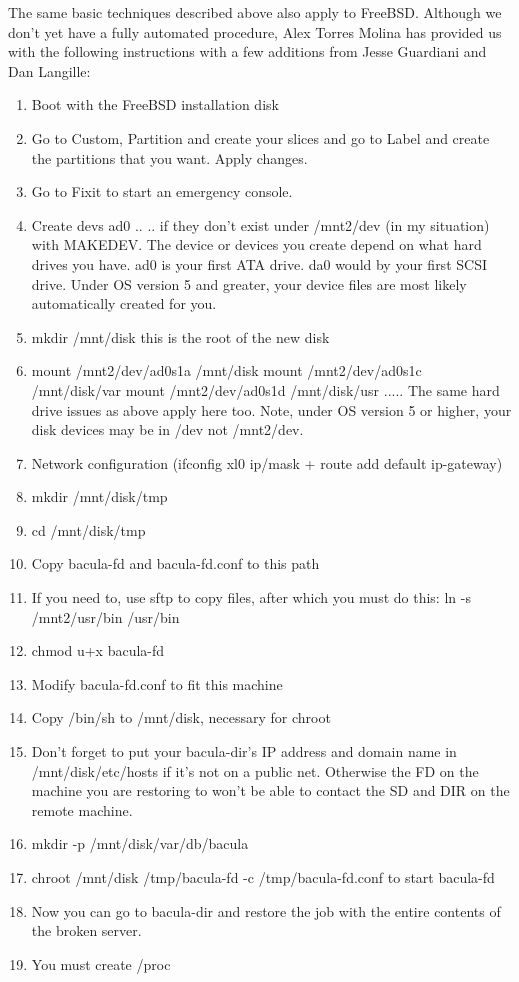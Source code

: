 The same basic techniques described above also apply to FreeBSD. Although we
don't yet have a fully automated procedure, Alex Torres Molina has provided us
with the following instructions with a few additions from Jesse Guardiani and
Dan Langille: 

\begin{enumerate}
\item Boot with the FreeBSD installation disk 
\item Go to Custom, Partition and create your slices and go to Label and 
   create the partitions that you want. Apply changes. 
\item Go to Fixit to start an emergency console. 
\item Create devs ad0 .. .. if they don't exist under /mnt2/dev (in my  situation)
   with MAKEDEV. The device or devices you  create depend on what hard drives you
   have. ad0 is your  first ATA drive. da0 would by your first SCSI drive.  Under
OS version 5 and greater, your device files are  most likely automatically
created for you. 
\item mkdir /mnt/disk
   this is the root of the new disk 
\item mount /mnt2/dev/ad0s1a /mnt/disk
   mount /mnt2/dev/ad0s1c /mnt/disk/var
   mount /mnt2/dev/ad0s1d /mnt/disk/usr
.....
The same hard drive issues as above apply here too.  Note, under OS version 5
or higher, your disk devices may  be in /dev not /mnt2/dev. 
\item Network configuration (ifconfig xl0 ip/mask + route add default 
   ip-gateway) 
\item mkdir /mnt/disk/tmp 
\item cd /mnt/disk/tmp 
\item Copy bacula-fd and bacula-fd.conf to this path 
\item If you need to, use sftp to copy files, after which you must do this:
   ln -s /mnt2/usr/bin /usr/bin 
\item chmod u+x bacula-fd 
\item Modify bacula-fd.conf to fit this machine 
\item Copy /bin/sh to /mnt/disk, necessary for chroot 
\item Don't forget to put your bacula-dir's IP address and domain  name in
   /mnt/disk/etc/hosts if it's not on a public net.  Otherwise the FD on the
   machine you are restoring to  won't be able to contact the SD and DIR on the
remote machine. 
\item mkdir -p /mnt/disk/var/db/bacula 
\item chroot /mnt/disk /tmp/bacula-fd -c /tmp/bacula-fd.conf
   to start bacula-fd 
\item Now you can go to bacula-dir and restore the job with the entire 
   contents of the broken server. 
\item You must create /proc 
\end{enumerate}

